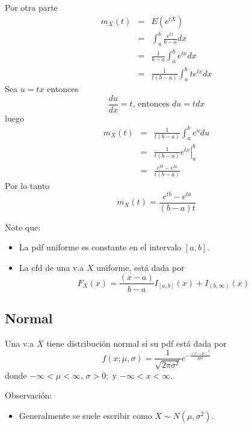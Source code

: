 \begin{i}
Por otra parte
\begin{eqnarray*}
m_{X}(t) &=&E(e^{tX}) \\
&=&\int_{a}^{b}\frac{e^{tx}}{b-a}dx \\
&=&\frac{1}{b-a}\int_{a}^{b}e^{tx}dx \\
&=&\frac{1}{t(b-a)}\int_{a}^{b}te^{tx}dx
\end{eqnarray*}
Sea $u=tx$ entonces 
\begin{equation*}
\frac{du}{dx}=t\text{, entonces }du=tdx
\end{equation*}
luego 
\begin{eqnarray*}
m_{X}(t) &=&\frac{1}{t(b-a)}\int_{a}^{b}e^{u}du \\
&=&\frac{1}{t(b-a)}\left. e^{tx}\right\vert _{a}^{b} \\
&=&\frac{e^{tb}-e^{ta}}{t(b-a)}
\end{eqnarray*}
Por lo tanto
\begin{equation*}
m_{X}(t)=\frac{e^{tb}-e^{ta}}{(b-a)t}
\end{equation*}

Note que:
\begin{itemize}
\item La pdf uniforme es constante en el intervalo $[a,b]$.

\item La cfd de una v.a $X$ uniforme, está dada por 
\begin{equation*}
F_{X}(x)=\frac{(x-a)}{b-a}I_{[a,b]}(x)+I_{(b,\infty )}(x)
\end{equation*}
\end{itemize}

\subsection{Normal}

\begin{definition}
Una v.a $X$ tiene distribución normal si su pdf está dada por 
\begin{equation*}
f(x;\mu ,\sigma )=\frac{1}{\sqrt{2\pi \sigma ^{2}}}e^{-\frac{(x-\mu )^{2}}{
2\sigma ^{2}}}
\end{equation*}
donde $-\infty <\mu <\infty $, $\sigma >0;$ y $-\infty <x<\infty$.
\end{definition}

Observación:
\begin{itemize}
\item Generalmente se suele escribir como $X\sim N(\mu ,\sigma ^{2}).$
\end{itemize}


\end{i}
